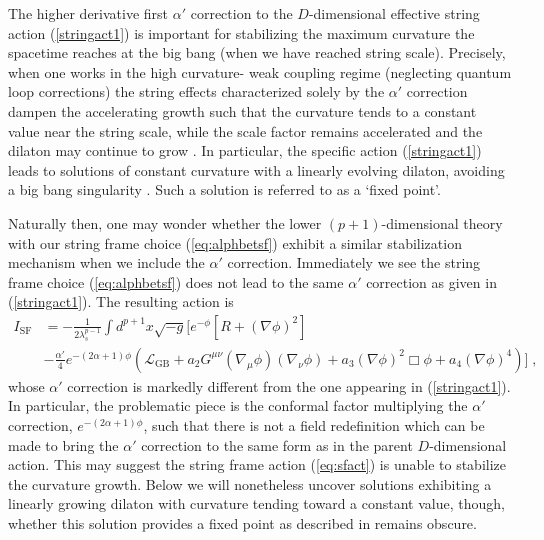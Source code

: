 \documentclass[amsmath,amssymb,11pt]{article}
\newcommand{\beq}{\begin{equation}}
\newcommand{\eeq}{\end{equation}}
\begin{document}
The higher derivative first $\alpha'$ correction to the $D$-dimensional effective string action (\ref{stringact1}) is important for stabilizing the maximum curvature the spacetime reaches at the big bang (when we have reached string scale). Precisely, when one works in the high curvature- weak coupling regime (neglecting quantum loop corrections) the string effects characterized solely by the $\alpha'$ correction dampen the accelerating growth such that the curvature tends to a constant value near the string scale, while the scale factor remains accelerated and the dilaton may continue to grow \cite{Gasperini:1996fu}. In particular, the specific action (\ref{stringact1}) leads to solutions of constant curvature with a linearly evolving dilaton, avoiding a big bang singularity \cite{Gasperini:1991ak}.  Such a solution is referred to as a `fixed point'. 


 Naturally then, one may wonder whether the lower $(p+1)$-dimensional theory with our string frame choice (\ref{eq:alphbetsf}) exhibit a similar stabilization mechanism when we include the $\alpha'$ correction. Immediately we see the string frame choice (\ref{eq:alphbetsf}) does not lead to the same $\alpha'$ correction as given in (\ref{stringact1}). The resulting action is
\beq
\begin{split}
 I_{\text{SF}}&=-\frac{1}{2\lambda_{s}^{p-1}}\int d^{p+1}x\sqrt{-g}\biggr[e^{-\phi}[R+(\nabla\phi)^{2}]\\
&-\frac{\alpha'}{4}e^{-(2\alpha+1)\phi}\left(\mathcal{L}_{\text{GB}}+a_{2}G^{\mu\nu}(\nabla_{\mu}\phi)(\nabla_{\nu}\phi)+a_{3}(\nabla\phi)^{2}\Box\phi+a_{4}(\nabla\phi)^{4}\right)\biggr]\;,
\end{split}
\label{eq:sfact}\eeq
 whose $\alpha'$ correction is markedly different from the one appearing in (\ref{stringact1}). In particular, the problematic piece is the conformal factor multiplying the $\alpha'$ correction, $e^{-(2\alpha+1)\phi}$, such that there is not a field redefinition which can be made to bring the $\alpha'$ correction to the same form as in the parent $D$-dimensional action. This may suggest the string frame action (\ref{eq:sfact}) is unable to stabilize the curvature growth. Below we will nonetheless uncover solutions exhibiting a linearly growing dilaton with curvature tending toward a constant value, though, whether this solution provides a fixed point as described in \cite{Gasperini:1991ak} remains obscure. 




\end{document}
